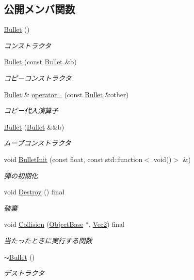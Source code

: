 \subsection*{公開メンバ関数}
\begin{DoxyCompactItemize}
\item 
\mbox{\hyperlink{class_bullet_acd7befc0bc18907cc1d871d37bbdddeb}{Bullet}} ()
\begin{DoxyCompactList}\small\item\em コンストラクタ \end{DoxyCompactList}\item 
\mbox{\hyperlink{class_bullet_a7e1ed7ba89e019b3d0fd068cfb4f9a6d}{Bullet}} (const \mbox{\hyperlink{class_bullet}{Bullet}} \&b)
\begin{DoxyCompactList}\small\item\em コピーコンストラクタ \end{DoxyCompactList}\item 
\mbox{\hyperlink{class_bullet}{Bullet}} \& \mbox{\hyperlink{class_bullet_a2a98443028be8389c0eb9da9a09f661c}{operator=}} (const \mbox{\hyperlink{class_bullet}{Bullet}} \&other)
\begin{DoxyCompactList}\small\item\em コピー代入演算子 \end{DoxyCompactList}\item 
\mbox{\hyperlink{class_bullet_a4bf8f227cde57a6abcdd268df2ef9a9d}{Bullet}} (\mbox{\hyperlink{class_bullet}{Bullet}} \&\&b)
\begin{DoxyCompactList}\small\item\em ムーブコンストラクタ \end{DoxyCompactList}\item 
void \mbox{\hyperlink{class_bullet_ab6b7b4ebc19095372a8e5ef3ad45ff65}{Bullet\+Init}} (const float, const std\+::function$<$ void()$>$ \&)
\begin{DoxyCompactList}\small\item\em 弾の初期化 \end{DoxyCompactList}\item 
void \mbox{\hyperlink{class_bullet_a09a92c6b924fb6bc38e18f6c41ac20ff}{Destroy}} () final
\begin{DoxyCompactList}\small\item\em 破棄 \end{DoxyCompactList}\item 
void \mbox{\hyperlink{class_bullet_a7a6bbc20017be35140ed1099ea457429}{Collision}} (\mbox{\hyperlink{class_object_base}{Object\+Base}} $\ast$, \mbox{\hyperlink{common_8h_ae148fff5818e9444b4ab2288829559bf}{Vec2}}) final
\begin{DoxyCompactList}\small\item\em 当たったときに実行する関数 \end{DoxyCompactList}\item 
\mbox{\hyperlink{class_bullet_aaeb5cb41d7db89f49007b08b41f1bfcf}{$\sim$\+Bullet}} ()
\begin{DoxyCompactList}\small\item\em デストラクタ \end{DoxyCompactList}\end{DoxyCompactItemize}
